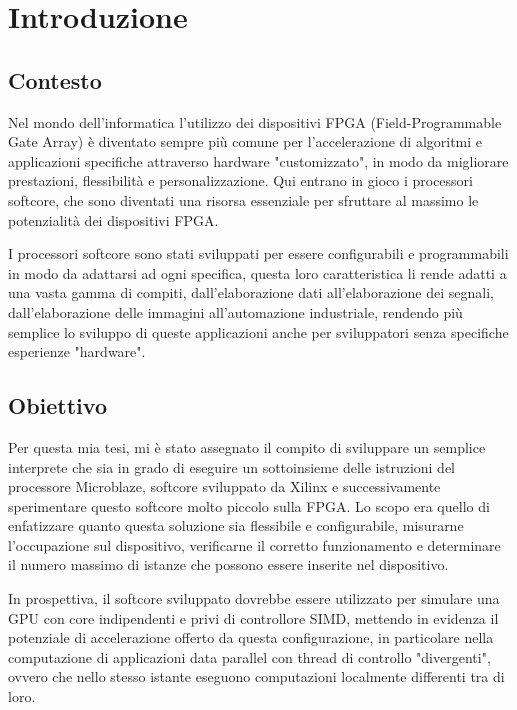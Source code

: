 \chapter{Introduzione}

\section{Contesto}
Nel mondo dell'informatica l'utilizzo dei dispositivi FPGA (Field-Programmable Gate Array) è diventato sempre più comune per l'accelerazione di algoritmi e applicazioni specifiche attraverso hardware "customizzato", in modo da migliorare prestazioni, flessibilità e personalizzazione. Qui entrano in gioco i processori softcore, che sono diventati una risorsa essenziale per sfruttare al massimo le potenzialità dei dispositivi FPGA. 

I processori softcore sono stati sviluppati per essere configurabili e programmabili in modo da adattarsi ad ogni specifica, questa loro caratteristica li rende adatti a una vasta gamma di compiti, dall'elaborazione dati all'elaborazione dei segnali, dall'elaborazione delle immagini all'automazione industriale, rendendo più semplice lo sviluppo di queste applicazioni anche per sviluppatori senza specifiche esperienze "hardware".

\vspace{1.3cm}

\section{Obiettivo}
Per questa mia tesi, mi è stato assegnato il compito di sviluppare un semplice interprete che sia in grado di eseguire un sottoinsieme delle istruzioni del processore Microblaze, softcore sviluppato da Xilinx e successivamente sperimentare questo softcore molto piccolo sulla FPGA. Lo scopo era quello di enfatizzare quanto questa soluzione sia flessibile e configurabile, misurarne l'occupazione sul dispositivo, verificarne il corretto funzionamento e determinare il numero massimo di istanze che possono essere inserite nel dispositivo.

In prospettiva, il softcore sviluppato dovrebbe essere utilizzato per simulare una GPU con core indipendenti e privi di controllore SIMD, mettendo in evidenza il potenziale di accelerazione offerto da questa configurazione, in particolare nella computazione di applicazioni data parallel con thread di controllo "divergenti", ovvero che nello stesso istante eseguono computazioni localmente differenti tra di loro. 


